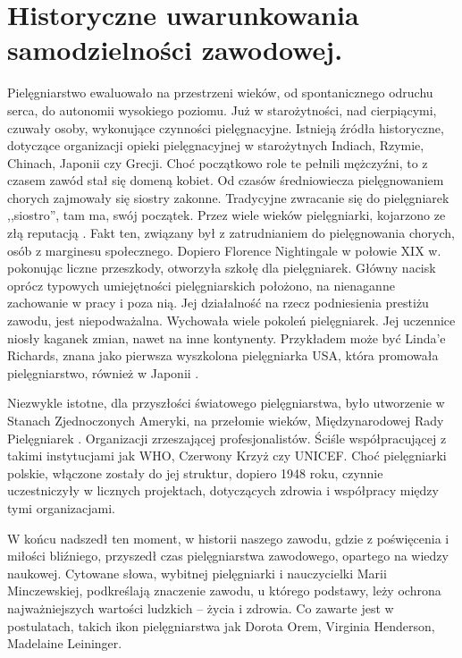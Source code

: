 \documentclass[a4paper,12pt,twoside,openany]{report}
\begin{document}
\section{Historyczne uwarunkowania samodzielności zawodowej.}
Pielęgniarstwo ewaluowało na przestrzeni wieków, od spontanicznego odruchu serca, do autonomii wysokiego poziomu. Już w starożytności, nad cierpiącymi, czuwały osoby, wykonujące czynności pielęgnacyjne. Istnieją źródła historyczne, dotyczące organizacji opieki pielęgnacyjnej w starożytnych Indiach, Rzymie, Chinach, Japonii czy Grecji. Choć początkowo role te pełnili mężczyźni, to z czasem zawód stał się domeną kobiet.\cite{zro} Od czasów średniowiecza pielęgnowaniem chorych zajmowały się siostry zakonne. Tradycyjne zwracanie się do pielęgniarek ,,siostro”, tam ma, swój początek. Przez wiele wieków pielęgniarki, kojarzono ze złą reputacją \cite{tlo}. Fakt ten, związany był z zatrudnianiem do pielęgnowania chorych, osób z marginesu społecznego. Dopiero Florence Nightingale w połowie XIX w. pokonując liczne przeszkody, otworzyła szkołę dla pielęgniarek. Główny nacisk oprócz typowych umiejętności pielęgniarskich położono, na nienaganne zachowanie w pracy i poza nią. Jej działalność na rzecz podniesienia prestiżu zawodu, jest niepodważalna. \cite{flo} Wychowała wiele pokoleń pielęgniarek. Jej uczennice niosły kaganek zmian, nawet na inne kontynenty. Przykładem może być Linda'e Richards, znana jako pierwsza wyszkolona pielęgniarka USA, która promowała pielęgniarstwo, również w Japonii \cite{linda}.

Niezwykle istotne, dla przyszłości światowego pielęgniarstwa, było utworzenie w Stanach Zjednoczonych Ameryki, na przełomie wieków, Międzynarodowej Rady Pielęgniarek \cite{rada}. Organizacji zrzeszającej profesjonalistów. Ściśle współpracującej z takimi instytucjami jak WHO, Czerwony Krzyż czy UNICEF. Choć pielęgniarki polskie, włączone zostały do jej struktur, dopiero 1948 roku, czynnie uczestniczyły w licznych projektach, dotyczących zdrowia i współpracy między tymi organizacjami.

W końcu nadszedł ten moment, w historii naszego zawodu, gdzie z poświęcenia i miłości bliźniego, przyszedł czas pielęgniarstwa zawodowego, opartego na wiedzy naukowej. Cytowane słowa, wybitnej pielęgniarki i nauczycielki Marii Minczewskiej, podkreślają znaczenie zawodu, u którego podstawy, leży  ochrona najważniejszych wartości ludzkich – życia i zdrowia.  Co zawarte jest w postulatach, takich ikon pielęgniarstwa jak Dorota Orem, Virginia Henderson, Madelaine Leininger.\cite{ikon}
\end{document}
